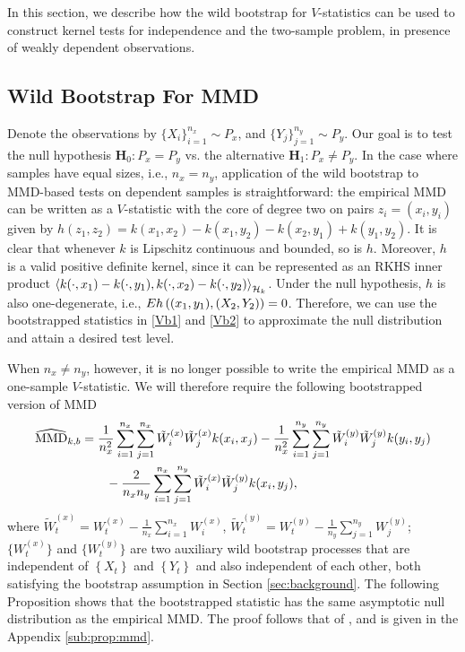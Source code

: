 In this section, we describe how the wild bootstrap for $V$-statistics can be used to construct kernel tests for independence and the two-sample problem, in presence of weakly dependent observations.

\subsection{Wild Bootstrap For MMD}
Denote the observations by $\{X_i\}_{i=1}^{n_x}\sim P_x$, and $\{Y_j\}_{j=1}^{n_y}\sim P_y$. Our goal is to test the null hypothesis $\mathbf H_0: P_x=P_y$ vs. 
the alternative $\mathbf H_1: P_x\neq P_y$. In the case where samples have equal sizes, i.e., $n_x=n_y$, application of the wild bootstrap to MMD-based tests on dependent samples is straightforward: the empirical MMD can be written as a $V$-statistic with the core of degree two on pairs $z_i=(x_i,y_i)$ given by $h(z_1,z_2) = k(x_1,x_2)- k(x_1,y_2) - k(x_2,y_1) + k(y_1,y_2)$. It is clear that whenever $k$ is Lipschitz continuous and bounded, so is $h$. Moreover, $h$ is a valid positive definite kernel, since it can be represented as an RKHS inner product  $\left\langle k(\cdot, x_1) -k(\cdot, y_1),k(\cdot, x_2) -k(\cdot, y_2) \right\rangle_{\mathcal{H}_k}$. Under the null hypothesis, $h$ is also one-degenerate, i.e., $E h\left((x_1,y_1),(X_2,Y_2)\right) = 0$. Therefore, we can use the bootstrapped statistics in \eqref{Vb1} and \eqref{Vb2} to approximate the null distribution and attain a desired test level.

When $n_x\neq n_y$, however, it is no longer possible to write the empirical MMD
as a one-sample $V$-statistic. We will therefore require the following bootstrapped version of MMD
\begin{align}
\widehat{\text{MMD}}_{k,b}&=\frac{1}{n_x^2}\sum_{i=1}^{n_x}\sum_{j=1}^{n_x}\tilde W_i^{(x)}\tilde W_j^{(x)}k(x_i,x_j)-\frac{1}{n_x^2}\sum_{i=1}^{n_y}\sum_{j=1}^{n_y}\tilde W_i^{(y)}\tilde W_j^{(y)}k(y_i,y_j)\notag\\
{}&\qquad-\frac{2}{n_x n_y}\sum_{i=1}^{n_x}\sum_{j=1}^{n_y}\tilde W_i^{(x)}\tilde W_j^{(y)}k(x_i,y_j),\label{eq:mmdkb}
\end{align}
where $\tilde W_t^{(x)}=W_t^{(x)}-\frac{1}{n_x}\sum_{i=1}^{n_x}W_i^{(x)}$, $\tilde W_t^{(y)}=W_t^{(y)}-\frac{1}{n_y}\sum_{j=1}^{n_y}W_j^{(y)}$;  $\{W_t^{(x)}\}$ and $\{W_t^{(y)}\}$ are two auxiliary wild bootstrap processes that are independent of $\left\{ X_t \right\}$ and $\left\{ Y_t \right\}$ and also independent of each other, both satisfying the bootstrap assumption in Section \ref{sec:background}.  
The following Proposition shows that the bootstrapped statistic has the same asymptotic null distribution as the empirical MMD. The proof follows that of \cite[Theorem 3.1]{leucht_dependent_2013}, and is given in the Appendix \ref{sub:prop:mmd}.


